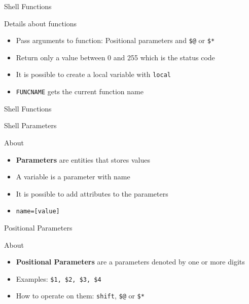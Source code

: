 \documentclass[10pt, compress, aspectratio=169]{beamer}
\begin{document}
\begin{frame}{Shell Functions}
  \begin{exampleblock}{Details about functions}
    \begin{itemize}
      \item Pass arguments to function: Positional parameters and \texttt{\$@}
            or \texttt{\$*}
      \item Return only a value between 0 and 255 which is the status code
      \item It is possible to create a local variable with \texttt{local}
      \item \texttt{FUNCNAME} gets the current function name
    \end{itemize}
  \end{exampleblock}
\end{frame}

\begin{frame}{Shell Functions}
  
\end{frame}

\begin{frame}{Shell Parameters}
  \begin{exampleblock}{About}
    \begin{itemize}
      \item \textbf{Parameters} are entities that stores values
      \item A variable is a parameter with name
      \item It is possible to add attributes to the parameters
      \item \texttt{name=[value]}
    \end{itemize}
  \end{exampleblock}
\end{frame}

\begin{frame}{Positional Parameters}
  \begin{exampleblock}{About}
    \begin{itemize}
      \item \textbf{Positional Parameters} are a parameters denoted by one or
            more digits
      \item Examples: \texttt{\$1, \$2, \$3, \$4}
      \item How to operate on them: \texttt{shift}, \texttt{\$@} or \texttt{\$*}
    \end{itemize}
  \end{exampleblock}
\end{frame}
\end{document}
